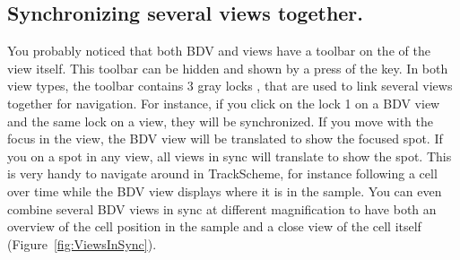 \subsection{Synchronizing several views together.}

You probably noticed that both BDV and \TrackScheme views have a toolbar on the of the view itself.
This toolbar can be hidden and shown by a press of the  key.
In both view types, the toolbar contains 3 gray locks , that are used to link several views together for navigation.
For instance, if you click on the lock 1  on a BDV view and the same lock on a \TrackScheme view, they will be synchronized.
If you move with the focus in the \TrackScheme view, the BDV view will be translated to show the focused spot.
If you  on a spot in any view, all views in sync will translate to show the spot.
This is very handy to navigate around in TrackScheme, for instance following a cell over time while the BDV view displays where it is in the sample. 
You can even combine several BDV views in sync at different magnification to have both an overview of the cell position in the sample and a close view of the cell itself (Figure~\ref{fig:ViewsInSync}).


